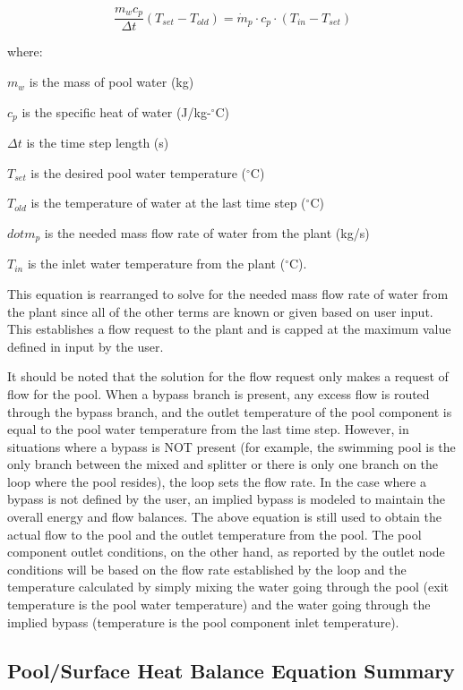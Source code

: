 \begin{equation}
\frac{m_w c_p}{\Delta t} (T_{set}-T_{old}) = \dot{m}_p \cdot c_p \cdot (T_{in} - T_{set} )
\end{equation}

where:

\(m_w\) is the mass of pool water (kg)

\(c_p\) is the specific heat of water (J/kg-\(^{\circ}\)C)

\(\Delta t\) is the time step length (s)

\(T_{set}\) is the desired pool water temperature (\(^{\circ}\)C)

\(T_{old}\) is the temperature of water at the last time step (\(^{\circ}\)C)

\(dot{m}_p\) is the needed mass flow rate of water from the plant (kg/s)

\(T_{in}\) is the inlet water temperature from the plant (\(^{\circ}\)C).


This equation is rearranged to solve for the needed mass flow rate of water from the plant since all of the other terms are known or given based on user input. This establishes a flow request to the plant and is capped at the maximum value defined in input by the user.

It should be noted that the solution for the flow request only makes a request of flow for the pool. When a bypass branch is present, any excess flow is routed through the bypass branch, and the outlet temperature of the pool component is equal to the pool water temperature from the last time step. However, in situations where a bypass is NOT present (for example, the swimming pool is the only branch between the mixed and splitter or there is only one branch on the loop where the pool resides), the loop sets the flow rate.  In the case where a bypass is not defined by the user, an implied bypass is modeled to maintain the overall energy and flow balances.  The above equation is still used to obtain the actual flow to the pool and the outlet temperature from the pool. The pool component outlet conditions, on the other hand, as reported by the outlet node conditions will be based on the flow rate established by the loop and the temperature calculated by simply mixing the water going through the pool (exit temperature is the pool water temperature) and the water going through the implied bypass (temperature is the pool component inlet temperature).

\subsection{Pool/Surface Heat Balance Equation Summary}\label{poolsurface-heat-balance-equation-summary}

